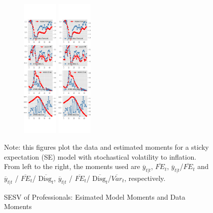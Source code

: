\documentclass[]{article}
\begin{document}
\begin{figure}[ht]
\begin{subfigure}[b]{\textwidth}
		\includegraphics[width=0.19\textwidth]{figures/spf_se_est_sv_diag3.png}
		\includegraphics[width=0.19\textwidth]{figures/spf_se_est_sv_diag4.png}
	\end{subfigure}
	\begin{flushleft}
		{\footnotesize Note: this figures plot the data and estimated moments for a  sticky expectation (SE) model with stochastical volatility to inflation. From left to the right, the moments used are $\overline y_{t|t}$, $\overline{FE}_{t}$, $\overline y_{t|t}$/$\overline{FE}_{t}$ and $\overline y_{t|t}$ / $\overline{FE}_{t}$/ $\overline{\textrm{Disg}_t}$, $\overline y_{t|t}$ / $\overline{FE}_{t}$/ $\overline{\textrm{Disg}_t}$/$\overline{Var}_t$,  respectively. }
	\end{flushleft}
	\caption{SESV of Professionals: Esimated Model Moments and Data Moments}
\end{figure}
\end{document}
